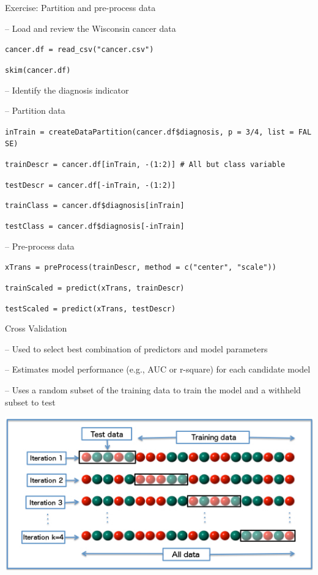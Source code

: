 \documentclass[ignorenonframetext,]{beamer}
\begin{document}
\begin{frame}[fragile]{Exercise: Partition and pre-process data}

-- Load and review the Wisconsin cancer data

\texttt{cancer.df\ =\ read\_csv("cancer.csv")}

\texttt{skim(cancer.df)}

-- Identify the diagnosis indicator

-- Partition data

\texttt{inTrain\ =\ createDataPartition(cancer.df\$diagnosis,\ p\ =\ 3/4,\ list\ =\ FALSE)}

\texttt{trainDescr\ =\ cancer.df{[}inTrain,\ -(1:2){]}\ \#\ All\ but\ class\ variable}

\texttt{testDescr\ =\ cancer.df{[}-inTrain,\ -(1:2){]}}

\texttt{trainClass\ =\ cancer.df\$diagnosis{[}inTrain{]}}

\texttt{testClass\ =\ cancer.df\$diagnosis{[}-inTrain{]}}

-- Pre-process data

\texttt{xTrans\ =\ preProcess(trainDescr,\ method\ =\ c("center",\ "scale"))}

\texttt{trainScaled\ =\ predict(xTrans,\ trainDescr)}

\texttt{testScaled\ =\ predict(xTrans,\ testDescr)}

\end{frame}

\begin{frame}{Cross Validation}

-- Used to select best combination of predictors and model parameters

-- Estimates model performance (e.g., AUC or r-square) for each
candidate model

-- Uses a random subset of the training data to train the model and a
withheld subset to test

\includegraphics[width=7.01in]{K-fold_cross_validation}

\end{frame}
\end{document}
